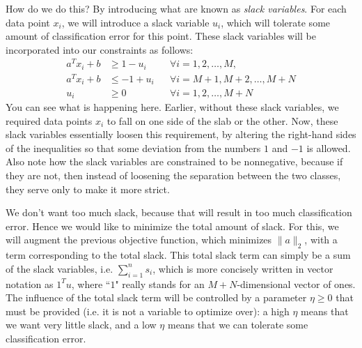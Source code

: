 \documentclass[a4paper]{article}
\theoremstyle{definition}
\begin{document}
How do we do this?
By introducing what are known as \textit{slack variables}.
For each data point $x_i$, we will introduce a slack variable $u_i$, which will tolerate some amount of classification error for this point.
These slack variables will be incorporated into our constraints as follows:
\begin{align*}
	a^T x_i + b & \geq 1 - u_i && \forall i = 1, 2, \dots, M, \\
	a^T x_i + b & \leq -1 + u_i && \forall i = M{+}1, M{+}2, \dots, M{+}N \\
	u_i & \geq 0 && \forall i = 1, 2, \dots, M{+}N
\end{align*}
You can see what is happening here.
Earlier, without these slack variables, we required data points $x_i$ to fall on one side of the slab or the other.
Now, these slack variables essentially loosen this requirement, by altering the right-hand sides of the inequalities so that some deviation from the numbers $1$ and $-1$ is allowed.
Also note how the slack variables are constrained to be nonnegative, because if they are not, then instead of loosening the separation between the two classes, they serve only to make it more strict.

We don't want too much slack, because that will result in too much classification error.
Hence we would like to minimize the total amount of slack.
For this, we will augment the previous objective function, which minimizes $\| a \|_2$, with a term corresponding to the total slack.
This total slack term can simply be a sum of the slack variables, i.e. $\sum_{i=1}^n s_i$, which is more concisely written in vector notation as $1^T u$, where ``$1$" really stands for an $M{+}N$-dimensional vector of ones.
The influence of the total slack term will be controlled by a parameter $\eta \geq 0$ that must be provided (i.e. it is not a variable to optimize over): a high $\eta$ means that we want very little slack, and a low $\eta$ means that we can tolerate some classification error.
\end{document}
